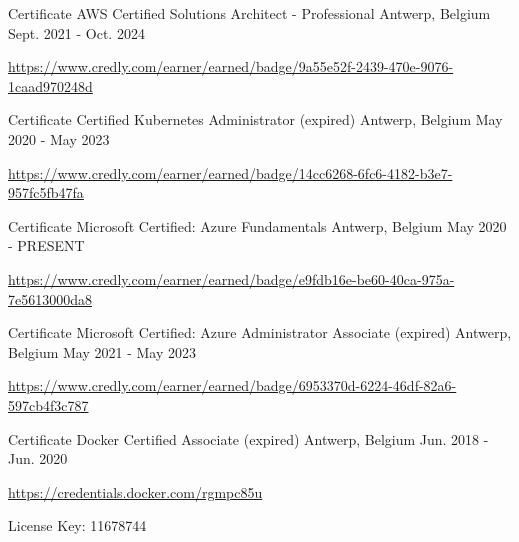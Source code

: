 \begin{cventries}
  \cventry
    {Certificate} %
    {AWS Certified Solutions Architect - Professional} %
    {Antwerp, Belgium} %
    {Sept. 2021 - Oct. 2024} %
    {
      \begin{cvitems} %
        \item \url{https://www.credly.com/earner/earned/badge/9a55e52f-2439-470e-9076-1caad970248d}
      \end{cvitems}
    }

  \cventry
    {Certificate} %
    {Certified Kubernetes Administrator (expired)} %
    {Antwerp, Belgium} %
    {May 2020 - May 2023} %
    {
      \begin{cvitems} %
        \item \url{https://www.credly.com/earner/earned/badge/14cc6268-6fc6-4182-b3e7-957fc5fb47fa}
      \end{cvitems}
    }

  \cventry
    {Certificate} %
    {Microsoft Certified: Azure Fundamentals} %
    {Antwerp, Belgium} %
    {May 2020 - PRESENT} %
    {
      \begin{cvitems} %
        \item \url{https://www.credly.com/earner/earned/badge/e9fdb16e-be60-40ca-975a-7e5613000da8}
      \end{cvitems}
    }

  \cventry
    {Certificate} %
    {Microsoft Certified: Azure Administrator Associate (expired)} %
    {Antwerp, Belgium} %
    {May 2021 - May 2023} %
    {
      \begin{cvitems} %
        \item \url{https://www.credly.com/earner/earned/badge/6953370d-6224-46df-82a6-597cb4f3c787}
      \end{cvitems}
    }

  \cventry
    {Certificate} %
    {Docker Certified Associate (expired)} %
    {Antwerp, Belgium} %
    {Jun. 2018 - Jun. 2020} %
    {
      \begin{cvitems} %
        \item \url{https://credentials.docker.com/rgmpc85u}
        \item {License Key: 11678744}
      \end{cvitems}
    }


\end{cventries}
